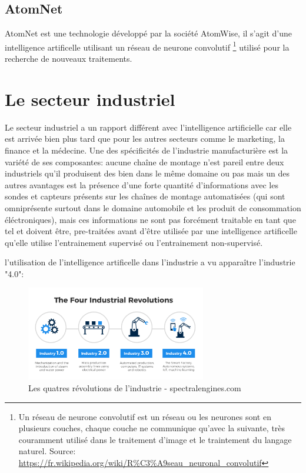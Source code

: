     \subsection{AtomNet}
        AtomNet est une technologie développé par la société AtomWise,
        il s'agit d'une intelligence artificelle utilisant un réseau de neurone convolutif
        \footnote{Un réseau de neurone convolutif est un réseau ou les neurones sont en plusieurs 
        couches, chaque couche ne communique qu'avec la suivante, très couramment utilisé dans le
        traitement d'image et le traintement du langage naturel.
        Source: \url{https://fr.wikipedia.org/wiki/R\%C3\%A9seau_neuronal_convolutif}}
        utilisé pour la recherche de nouveaux traitements. 




\newpage


\section{Le secteur industriel}
Le secteur industriel a un rapport différent avec l'intelligence artificielle car elle est arrivée 
bien plus tard que pour les autres secteurs comme le marketing, la finance et la médecine.
Une des spécificités de l'industrie manufacturière est la variété de ses composantes: 
aucune chaîne de montage n'est pareil entre deux industriels qu'il produisent des bien 
dans le même domaine ou pas mais un des autres avantages est la présence d'une forte quantité 
d'informations avec les sondes et capteurs présents sur les chaînes de montage automatisées 
(qui sont omniprésente surtout dans le domaine automobile et les produit de consommation éléctroniques), 
mais ces informations ne sont pas forcément traitable en tant que tel et doivent être, pre-traitées
avant d'être utilisée par une intelligence artificelle qu'elle utilise l'entrainement 
supervisé ou l'entrainement non-supervisé. \newline

l'utilisation de l'intelligence artificelle dans l'industrie a vu apparaître 
l'industrie "4.0":

\begin{figure}[H]
    \centering
    \includegraphics[width=0.7\textwidth]{Images/industryfour}
    \caption{Les quatres révolutions de l'industrie - spectralengines.com}
	\label{fig:fourindustrialrevolutions}
\end{figure}


